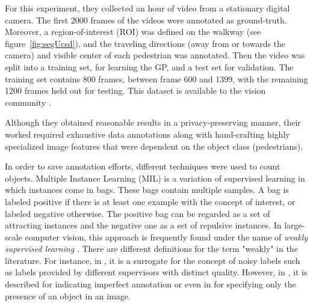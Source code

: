 For this experiment, they collected an hour of video from a stationary digital camera. The first 2000 frames of the videos were annotated as ground-truth. Moreover, a region-of-interest (ROI) was defined on the walkway (see figure~\ref{fig:segUcsd}), and the traveling directions (away from or towards the camera) and visible center of each pedestrian was annotated. Then the video was split into a training set, for learning the GP, and a test set for validation. The training set contains 800 frames, between frame 600 and 1399, with the remaining 1200 frames held out for testing. This dataset is available to the vision community \cite{chan2008privacy}.

Although they obtained reasonable results in a privacy-preserving manner, their worked required exhaustive data annotations along with hand-crafting highly specialized image features that were dependent on the object class (pedestrians).  



In order to save annotation efforts, different techniques were used to count objects. Multiple Instance Learning (MIL) \cite{foulds2010review} is a variation of supervised learning in which instances come in bags. These bags contain multiple samples. A bag is labeled positive if there is at least one example with the concept of interest, or labeled negative otherwise. The positive bag can be regarded as a set of attracting instances and the negative one as a set of repulsive instances. In large-scale computer vision, this approach is frequently found under the name of \textit{weakly supervised learning} \cite{weber2000unsupervised, fergus2003object}. There are different definitions for the term "weakly" in the literature. For instance, in \cite{dekel2009good}, it is a surrogate for the concept of noisy labels such as labels provided by different supervisors with distinct quality. However, in \cite{raykar2009supervised}, it is described for indicating imperfect annotation or even in \cite{wang2013weakly} for specifying only the presence of an object in an image. 

